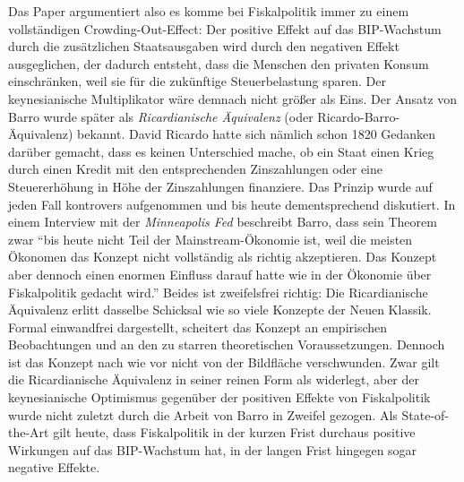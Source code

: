 Das Paper argumentiert also es komme bei Fiskalpolitik immer zu einem vollständigen Crowding-Out-Effect: Der positive Effekt auf das BIP-Wachstum durch die zusätzlichen Staatsausgaben wird durch den negativen Effekt ausgeglichen, der dadurch entsteht, dass die Menschen den privaten Konsum einschränken, weil sie für die zukünftige Steuerbelastung sparen. Der keynesianische Multiplikator wäre demnach nicht größer als Eins. Der Ansatz von Barro wurde später als \textit{Ricardianische Äquivalenz} (oder Ricardo-Barro-Äquivalenz) bekannt. David Ricardo hatte sich nämlich schon 1820 Gedanken darüber gemacht, dass es keinen Unterschied mache, ob ein Staat einen Krieg durch einen Kredit mit den entsprechenden Zinszahlungen oder eine Steuererhöhung in Höhe der Zinszahlungen finanziere. Das Prinzip wurde auf jeden Fall kontrovers aufgenommen und bis heute dementsprechend diskutiert. In einem Interview mit der \textit{Minneapolis Fed} beschreibt Barro, dass sein Theorem zwar "`bis heute nicht Teil der Mainstream-Ökonomie ist, weil die meisten Ökonomen das Konzept nicht vollständig als richtig akzeptieren. Das Konzept aber dennoch einen enormen Einfluss darauf hatte wie in der Ökonomie über Fiskalpolitik gedacht wird."' Beides ist zweifelsfrei richtig: Die Ricardianische Äquivalenz erlitt dasselbe Schicksal wie so viele Konzepte der Neuen Klassik. Formal einwandfrei dargestellt, scheitert das Konzept an empirischen Beobachtungen und an den zu starren theoretischen Voraussetzungen.
Dennoch ist das Konzept nach wie vor nicht von der Bildfläche verschwunden. Zwar gilt die Ricardianische Äquivalenz in seiner reinen Form als widerlegt, aber der keynesianische Optimismus gegenüber der positiven Effekte von Fiskalpolitik wurde nicht zuletzt durch die Arbeit von Barro in Zweifel gezogen. Als State-of-the-Art gilt heute, dass Fiskalpolitik in der kurzen Frist durchaus positive Wirkungen auf das BIP-Wachstum hat, in der langen Frist hingegen sogar negative Effekte.

